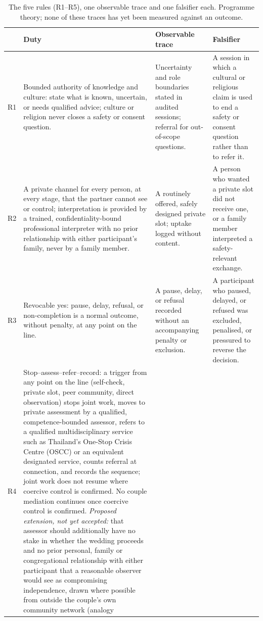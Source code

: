 \begin{table}[t]
\centering\footnotesize
\caption{The five rules (R1--R5), one observable trace and one falsifier each. Programme theory;
none of these traces has yet been measured against an outcome.}
\label{tab:rules}
\begin{tabularx}{\textwidth}{@{}p{0.9cm}YYY@{}}
\toprule
& \textbf{Duty} & \textbf{Observable trace} & \textbf{Falsifier}\\
\midrule
R1 & Bounded authority of knowledge and culture: state what is known, uncertain, or needs qualified
advice; culture or religion never closes a safety or consent question. & Uncertainty and role
boundaries stated in audited sessions; referral for out-of-scope questions. & A session in which a
cultural or religious claim is used to end a safety or consent question rather than to refer it.\\
R2 & A private channel for every person, at every stage, that the partner cannot see or control;
interpretation is provided by a trained, confidentiality-bound professional interpreter with
no prior relationship with either participant's family, never by a family member. & A routinely offered, safely designed private slot; uptake logged
without content. & A person who wanted a private slot did not receive one, or a family member
interpreted a safety-relevant exchange.\\
R3 & Revocable yes: pause, delay, refusal, or non-completion is a normal outcome, without penalty, at
any point on the line. & A pause, delay, or refusal recorded without an accompanying penalty or
exclusion. & A participant who paused, delayed, or refused was excluded, penalised, or pressured to
reverse the decision.\\
R4 & Stop--assess--refer--record: a trigger from any point on the line (self-check, private slot,
peer community, direct observation) stops joint work, moves to private assessment by a qualified,
competence-bounded assessor, refers to a qualified multidisciplinary service such as Thailand's
One-Stop Crisis Centre (OSCC) or an equivalent designated service, counts referral at connection, and
records the sequence; joint work does not resume where coercive control is confirmed. No couple
mediation continues once coercive control is confirmed. \emph{Proposed extension, not yet
accepted:} that assessor should additionally
have no stake in whether the wedding proceeds and no prior personal, family or congregational
relationship with either participant that a reasonable observer would see as compromising
independence, drawn where possible from outside the couple's own community network (analogy

\end{tabularx}
\end{table}
